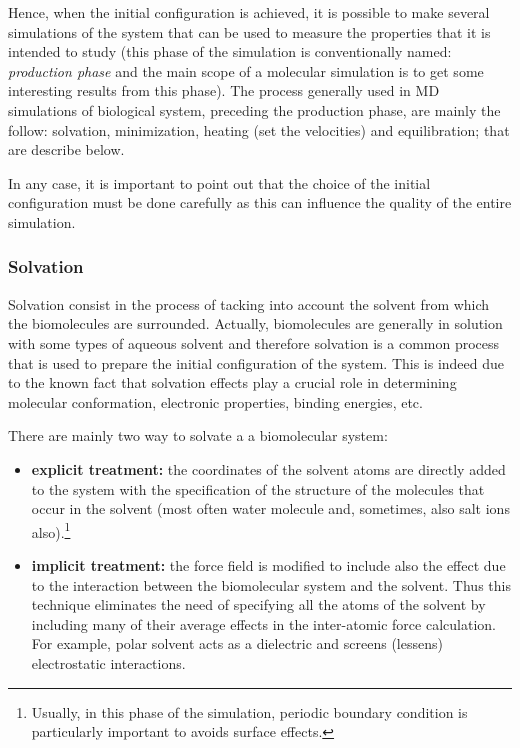 Hence, when the initial configuration is achieved, it is possible to make several simulations of the system that can be used to measure the properties that it is intended to study (this phase of the simulation is conventionally named: \textit{production phase} and the main scope of a molecular simulation is to get some interesting results from this phase). The process generally used in MD simulations of biological system, preceding the production phase, are mainly the follow: solvation, minimization, heating (set the velocities) and equilibration; that are describe below.

In any case, it is important to point out that the choice of the initial configuration must be done carefully as this can influence the quality of the entire simulation.

\subsubsection{Solvation}
Solvation consist in the process of tacking into account the solvent from which the biomolecules are surrounded. Actually, biomolecules are generally in solution with some types of aqueous solvent and therefore solvation is a common process that is used to prepare the initial configuration of the system. This is indeed due to the known fact that solvation effects play a crucial role in determining molecular conformation, electronic properties, binding energies, etc.

There are mainly two way to solvate a a biomolecular system:
\begin{itemize}
\item \textbf{explicit treatment:} the coordinates of the solvent atoms are directly added to the system with the specification of the structure of the molecules that occur in the solvent (most often water molecule and, sometimes, also salt ions also).\footnote{Usually, in this phase of the simulation, periodic boundary condition is particularly important to avoids surface effects.} 
\item \textbf{implicit treatment:} the force field is modified to include also the effect due to the interaction between the biomolecular system and the solvent. Thus this technique eliminates the need of specifying all the atoms of the solvent by including many of their average effects in the inter-atomic force calculation. For example, polar solvent acts as a dielectric and screens (lessens) electrostatic interactions. 
\end{itemize}

